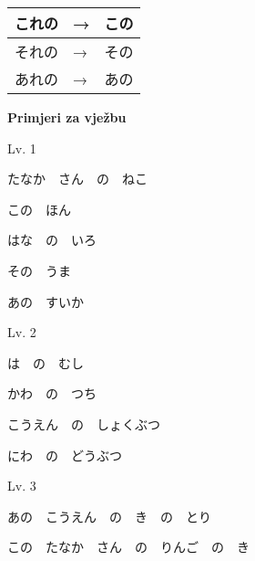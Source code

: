	\vspace{10pt}
	\begin{tabular}{|l|l|l|}
		\hline
		これの&→&この\\\hline
		それの&→&その\\\hline
		あれの&→&あの\\\hline
	\end{tabular}
	\vspace{10pt}
	
	\begin{reibun}
	\end{reibun}
		

	\normalsize \textbf{Primjeri za vježbu}
	
	\begin{mondai}{Lv. 1}
		\item たなか　さん　の　ねこ
		\item この　ほん
		\item はな　の　いろ
		\item その　うま
		\item あの　すいか
	\end{mondai}
	
	\begin{mondai}{Lv. 2}
		\item は　の　むし
		\item かわ　の　つち
		\item こうえん　の　しょくぶつ
		\item にわ　の　どうぶつ
	\end{mondai}
	
	\begin{mondai}{Lv. 3}
		\item あの　こうえん　の　き　の　とり
		\item この　たなか　さん　の　りんご　の　き
	\end{mondai}
	



